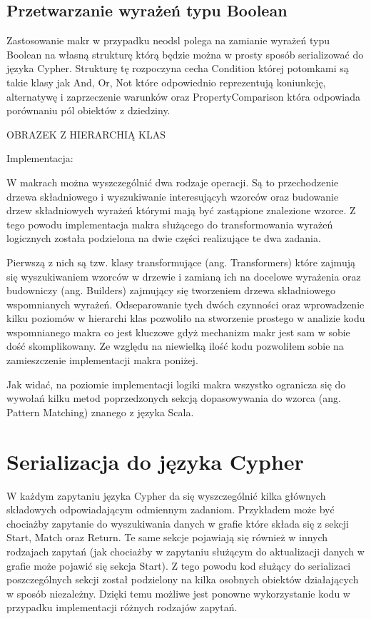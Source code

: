 \documentclass[brudnopis]{xmgr}
\begin{document}
\subsection{Przetwarzanie wyrażeń typu Boolean}

Zastosowanie makr w przypadku neodsl polega na zamianie wyrażeń typu Boolean na własną strukturę którą będzie można w prosty sposób serializować do języka Cypher. 
Strukturę tę rozpoczyna cecha Condition której potomkami są takie klasy jak And, Or, Not które odpowiednio reprezentują koniunkcję, alternatywę i zaprzeczenie warunków oraz PropertyComparison która odpowiada porównaniu pól obiektów z dziedziny.

OBRAZEK Z HIERARCHIĄ KLAS

Implementacja:

W makrach można wyszczególnić dwa rodzaje operacji. Są to przechodzenie drzewa składniowego i wyszukiwanie interesującyh wzorców oraz budowanie drzew składniowych wyrażeń którymi mają być zastąpione znalezione wzorce. Z tego powodu implementacja makra służącego do transformowania wyrażeń logicznych została podzielona na dwie części realizujące te dwa zadania.

Pierwszą z nich są tzw. klasy transformujące (ang. Transformers) które zajmują się wyszukiwaniem wzorców w drzewie i zamianą ich na docelowe wyrażenia oraz budowniczy (ang. Builders) zajmujący się tworzeniem drzewa składniowego wspomnianych wyrażeń. Odseparowanie tych dwóch czynności oraz wprowadzenie kilku poziomów w hierarchi klas pozwoliło na stworzenie prostego w analizie kodu wspomnianego makra co jest kluczowe gdyż mechanizm makr jest sam w sobie dość skomplikowany.  Ze względu na niewielką ilość kodu pozwoliłem sobie na zamieszczenie implementacji makra poniżej.



Jak widać, na poziomie implementacji logiki makra wszystko ogranicza się do wywołań kilku metod poprzedzonych sekcją dopasowywania do wzorca (ang. Pattern Matching) znanego z języka Scala.

\section{Serializacja do języka Cypher}

W każdym zapytaniu języka Cypher da się wyszczególnić kilka głównych składowych odpowiadającym odmiennym zadaniom. Przykładem może być chociażby zapytanie do wyszukiwania danych w grafie które składa się z sekcji Start, Match oraz Return. Te same sekcje pojawiają się również w innych rodzajach zapytań (jak chociażby w zapytaniu służącym do aktualizacji danych w grafie może pojawić się sekcja Start). Z tego powodu kod służący do serializaci poszczególnych sekcji  został podzielony na kilka osobnych obiektów działających w sposób niezależny. Dzięki temu możliwe jest ponowne wykorzystanie kodu w przypadku implementacji różnych rodzajów zapytań.
\end{document}
